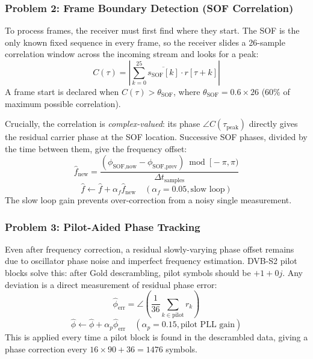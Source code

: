 \documentclass[12pt,a4paper]{report}
\begin{document}
\subsubsection{Problem 2: Frame Boundary Detection (SOF Correlation)}

To process frames, the receiver must first find where they start. The SOF is
the only known fixed sequence in every frame, so the receiver slides a
26-sample correlation window across the incoming stream and looks for a peak:
\begin{equation}
    C(\tau) = \left| \sum_{k=0}^{25} \overline{s_\text{SOF}[k]} \cdot r[\tau+k] \right|
\end{equation}
A frame start is declared when $C(\tau) > \theta_\text{SOF}$, where
$\theta_\text{SOF} = 0.6 \times 26$ (60\% of maximum possible correlation).

Crucially, the correlation is \emph{complex-valued}: its phase
$\angle C(\tau_\text{peak})$ directly gives the residual carrier phase at the
SOF location. Successive SOF phases, divided by the time between them,
give the frequency offset:
\begin{equation}
    \hat{f}_\text{new} = \frac{(\phi_\text{SOF,now} - \phi_\text{SOF,prev})
    \bmod [-\pi, \pi)}{\Delta t_\text{samples}}
\end{equation}
\begin{equation}
    \hat{f} \leftarrow \hat{f} + \alpha_f \hat{f}_\text{new}
    \quad (\alpha_f = 0.05, \text{slow loop})
\end{equation}
The slow loop gain prevents over-correction from a noisy single measurement.

\subsubsection{Problem 3: Pilot-Aided Phase Tracking}

Even after frequency correction, a residual slowly-varying phase offset remains
due to oscillator phase noise and imperfect frequency estimation. DVB-S2 pilot
blocks solve this: after Gold descrambling, pilot symbols should be $+1+0j$.
Any deviation is a direct measurement of residual phase error:
\begin{equation}
    \hat{\phi}_\text{err} = \angle\left(\frac{1}{36}\sum_{k \in \text{pilot}} r_k\right)
\end{equation}
\begin{equation}
    \hat{\phi} \leftarrow \hat{\phi} + \alpha_p \hat{\phi}_\text{err}
    \quad (\alpha_p = 0.15, \text{pilot PLL gain})
\end{equation}
This is applied every time a pilot block is found in the descrambled data,
giving a phase correction every $16 \times 90 + 36 = 1476$ symbols.
\end{document}
